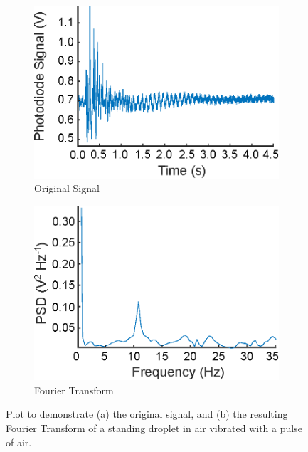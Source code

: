 \documentclass{physics_article_B}
\begin{document}
            \begin{figure}[H]
            \centering
                    \begin{subfigure}[b]{0.48\textwidth} \hspace*{0cm}\includegraphics[width=\textwidth]{Figures/WaterSignal.eps}
                    \caption{Original Signal}
                    \label{fig:Water:Signal}
                \end{subfigure}\hspace{3pt}
                \begin{subfigure}[b]{0.48\textwidth}
                    \hspace*{0.1cm}\includegraphics[width=\textwidth]{Figures/WaterSignalPD.eps}
                    \caption{Fourier Transform}
                    \label{fig:Water:FT}
                \end{subfigure}
            \caption{Plot to demonstrate (a) the original signal, and (b) the resulting Fourier Transform of a standing droplet in air vibrated with a pulse of air.}\label{fig:Water}
            \end{figure} 
\end{document}
